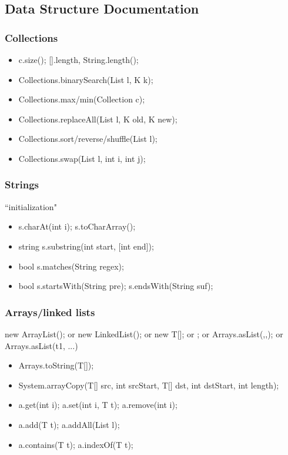 \subsection{Data Structure Documentation}
\subsubsection{Collections}
\begin{itemize}
    \itemsep0em
    \item c.size(); [].length, String.length();
    \item Collections.binarySearch(List l, K k);
    \item Collections.max/min(Collection c);
    \item Collections.replaceAll(List l, K old, K new);
    \item Collections.sort/reverse/shuffle(List l);
    \item Collections.swap(List l, int i, int j);
\end{itemize}
\subsubsection{Strings}
``initialization"
\begin{itemize}
    \itemsep0em
    \item s.charAt(int i); s.toCharArray();
    \item string s.substring(int start, [int end]);
    \item bool s.matches(String regex);
    \item bool s.startsWith(String pre); s.endsWith(String suf);
\end{itemize}
\subsubsection{Arrays/linked lists}
new ArrayList(); or new LinkedList(); or new T[]; or {}; or Arrays.asList(,,); or Arrays.asList(t1, ...)
\begin{itemize}
    \itemsep0em
    \item Arrays.toString(T[]);
    \item System.arrayCopy(T[] src, int srcStart, T[] dst, int dstStart, int length);
    \item a.get(int i); a.set(int i, T t); a.remove(int i);
    \item a.add(T t); a.addAll(List l);
    \item a.contains(T t); a.indexOf(T t);
\end{itemize}
